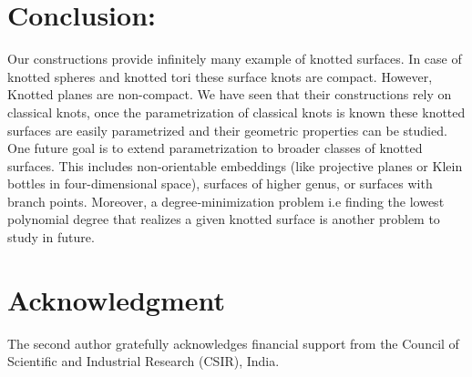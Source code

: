 \documentclass[10pt,a4paper,reqno]{amsart}
\theoremstyle{definition}
\theoremstyle{remark}
\begin{document}
 \section{Conclusion:}
 Our constructions provide infinitely many example of knotted surfaces. In case of knotted spheres and knotted tori these surface knots are compact. However,
 Knotted planes are non-compact. We have seen that their constructions rely on classical knots, once the parametrization of classical knots is known these knotted surfaces are easily parametrized and their geometric properties can be studied. One future goal is to extend parametrization to broader classes of knotted surfaces. This includes non‐orientable embeddings (like projective planes or Klein bottles in four-dimensional space), surfaces of higher genus, or surfaces with branch points. Moreover, a degree‐minimization problem i.e finding the lowest polynomial degree that realizes a given knotted surface is another problem to study in future.
 
 \section{Acknowledgment}  
 The second author gratefully acknowledges financial support from the Council of Scientific and Industrial Research (CSIR), India.
\end{document}
